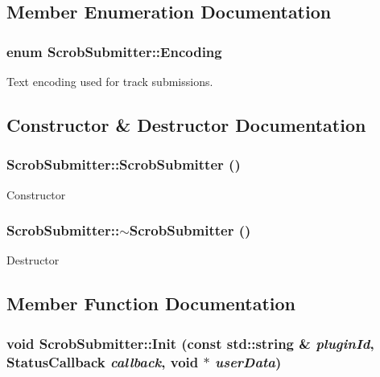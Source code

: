 \subsection{Member Enumeration Documentation}
\subsubsection{\setlength{\rightskip}{0pt plus 5cm}enum {\bf ScrobSubmitter::Encoding}}\label{class_scrob_submitter_743e06902c0318679a3d272f2c0b606a}


Text encoding used for track submissions. 

\subsection{Constructor \& Destructor Documentation}
\subsubsection{\setlength{\rightskip}{0pt plus 5cm}ScrobSubmitter::ScrobSubmitter ()}\label{class_scrob_submitter_bf93469f6106cafa21dc8c093629e13b}


Constructor 
\subsubsection{\setlength{\rightskip}{0pt plus 5cm}ScrobSubmitter::$\sim$ScrobSubmitter ()\hspace{0.3cm}{\tt  [virtual]}}\label{class_scrob_submitter_bc8808b8c6629975188417f5fdbc8856}


Destructor 

\subsection{Member Function Documentation}
\subsubsection{\setlength{\rightskip}{0pt plus 5cm}void ScrobSubmitter::Init (const std::string \& {\em pluginId}, {\bf StatusCallback} {\em callback}, void $\ast$ {\em userData})}\label{class_scrob_submitter_a35102b0accdf8f2edc2228da1cf47ff}


